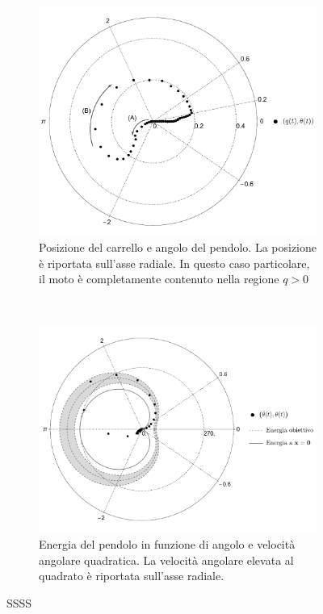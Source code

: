 
\begin{figure}
    \centering
    \begin{subfigure}[]{\textwidth}
        \centering
        \includegraphics[width=.75\textwidth]{assets/polar-swingup-real}
        \caption{Posizione del carrello e angolo del pendolo.
        La posizione è riportata sull'asse radiale. In questo
        caso particolare, il moto è
        completamente contenuto nella regione $q > 0$
        }
    \end{subfigure}
    \\[5ex]
    \begin{subfigure}[]{\textwidth}
        \centering
        \includegraphics[width=.8\textwidth]{assets/polar-swingup-energy}
        \caption{Energia del pendolo in funzione di angolo e
        velocità angolare quadratica.
        La velocità angolare elevata al quadrato è riportata sull'asse
        radiale.
        }
    \end{subfigure}

    \caption[SSSS]{
        SSSS
    }
    \label{fig:swingup-real-one}
\end{figure}



